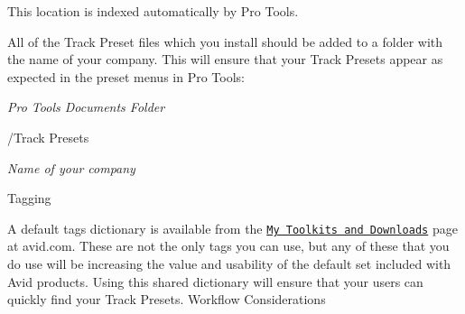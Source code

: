  This location is indexed automatically by Pro Tools.

 All of the Track Preset files which you install should be added to a folder with the name of your company. This will ensure that your Track Presets appear as expected in the preset menus in Pro Tools\+:

 
\begin{DoxyItemize}
\item {\itshape Pro Tools Documents Folder} 
\begin{DoxyItemize}
\item /\+Track Presets 
\begin{DoxyItemize}
\item 
\begin{DoxyItemize}
\item {\itshape Name of your company}  
\end{DoxyItemize}
\end{DoxyItemize}
\end{DoxyItemize}
\end{DoxyItemize}

  Tagging

 A default tags dictionary is available from the \href{https://my.avid.com/products/cppsdk}{\tt My Toolkits and Downloads} page at avid.\+com. These are not the only tags you can use, but any of these that you do use will be increasing the value and usability of the default set included with Avid products. Using this shared dictionary will ensure that your users can quickly find your Track Presets.  Workflow Considerations

